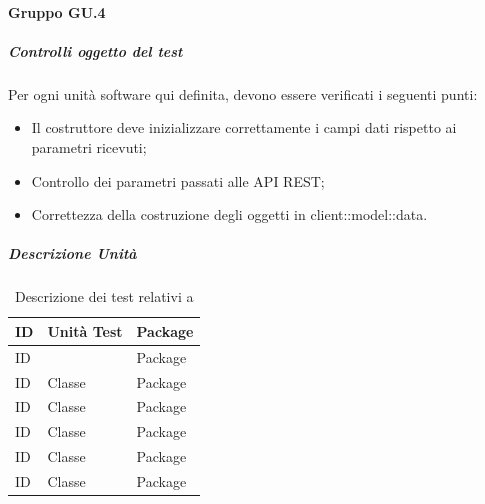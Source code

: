 \documentclass[12pt,a4paper]{article}
\begin{document}
\paragraph{Gruppo GU.4}
\subparagraph{Controlli oggetto del test}
Per ogni unità software qui definita, devono essere verificati i seguenti punti:
\begin{itemize}
	\item Il costruttore deve inizializzare correttamente i campi dati rispetto ai parametri ricevuti;
	\item Controllo dei parametri passati alle API REST;
	\item Correttezza della costruzione degli oggetti in client::model::data.
\end{itemize}
\subparagraph{Descrizione Unità}
\begin{table}[H]
	\begin{center}
		\begin{tabular}{p{} p{} p{}}
			\toprule
			\textbf{ID}   & \textbf{Unità Test}	& \textbf{Package} \\ \midrule
			\midrule
			ID &  & Package\\ \midrule
			ID & Classe & Package\\ \midrule
			ID & Classe & Package\\ \midrule
			ID & Classe & Package\\ \midrule
			ID & Classe & Package\\ \midrule
			ID & Classe & Package\\ \midrule
			
			\bottomrule
		\end{tabular}
	\end{center}
	\caption{Descrizione dei test relativi a \TODO{}}
\end{table}
\end{document}
